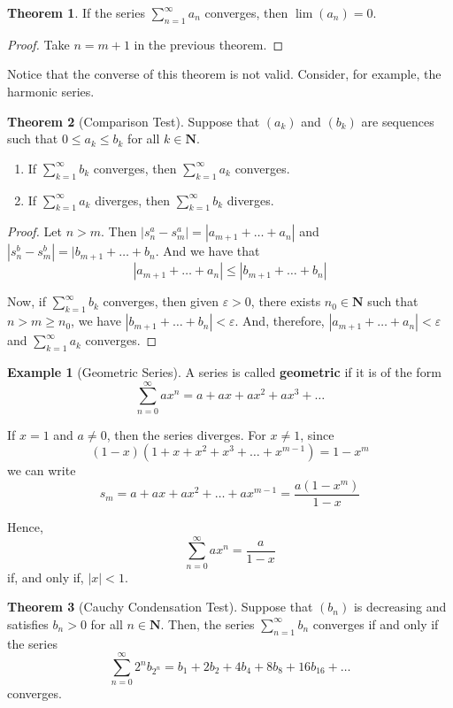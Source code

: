 \documentclass[12pt,a4paper]{article}
\theoremstyle{definition}
\newtheorem{theorem}{Theorem}[section]
\newtheorem{example}{Example}[section]
\begin{document}
\begin{theorem}
	If the series $\sum_{n=1}^\infty a_n$ converges, then $\lim (a_n) = 0$.
\end{theorem}

\begin{proof}
	Take $n = m+1$ in the previous theorem.
\end{proof}

Notice that the converse of this theorem is not valid. Consider, for example, the harmonic series. 

\begin{theorem}[Comparison Test]
	Suppose that $(a_k)$ and $(b_k)$ are sequences such that $0 \leq a_k \leq b_k$ for all $k \in \textbf{N}$.
	\begin{enumerate}
		\item If $\sum_{k=1}^\infty b_k$ converges, then $\sum_{k=1}^\infty a_k$ converges.
		\item If $\sum_{k=1}^\infty a_k$ diverges, then $\sum_{k=1}^\infty b_k$ diverges.
	\end{enumerate}
\end{theorem}

\begin{proof}
	Let $n > m$. Then $|s_n^a - s_m^a| = |a_{m+1} + \ldots + a_n|$ and $|s_n^b - s_m^b| = |b_{m+1} + \ldots + b_n$. And we have that \[ |a_{m+1} + \ldots + a_n | \leq |b_{m+1} + \ldots + b_n| \]
	
	Now, if $\sum_{k=1}^\infty b_k$ converges, then given $\varepsilon > 0$, there exists $n_0 \in \textbf{N}$ such that $n > m \geq n_0$, we have $|b_{m+1} + \ldots + b_n| < \varepsilon$. And, therefore, $|a_{m+1} + \ldots + a_n| < \varepsilon$ and $\sum_{k=1}^\infty a_k$ converges.
\end{proof}

\begin{example}[Geometric Series]
	A series is called \textbf{geometric} if it is of the form
	\[
		\sum_{n=0}^\infty ax^n = a + ax + ax^2 + ax^3 + \ldots
	\]
	
	If $x = 1$ and $a \neq 0$, then the series diverges. For $x \neq 1$, since
	\[
		(1-x)(1+x+x^2+x^3+\ldots+x^{m-1}) = 1 - x^m 
	\]
	we can write
	\[
		s_m = a + ax + ax^2 + \ldots + ax^{m-1} = \frac{a(1-x^m)}{1-x}
	\]
	
	Hence, 
	\[
		\sum_{n=0}^\infty ax^n = \frac{a}{1-x}
	\]
	if, and only if, $|x| < 1$.
\end{example}

\begin{theorem}[Cauchy Condensation Test]
	Suppose that $(b_n)$ is decreasing and satisfies $b_n > 0$ for all $n \in \textbf{N}$. Then, the series $\sum_{n=1}^\infty b_n$ converges if and only if the series
	\[
		\sum_{n=0}^\infty 2^n b_{2^n} = b_1 + 2b_2 + 4b_4 + 8b_8 + 16b_16 + \ldots
	\]
	converges.
\end{theorem}
\end{document}

